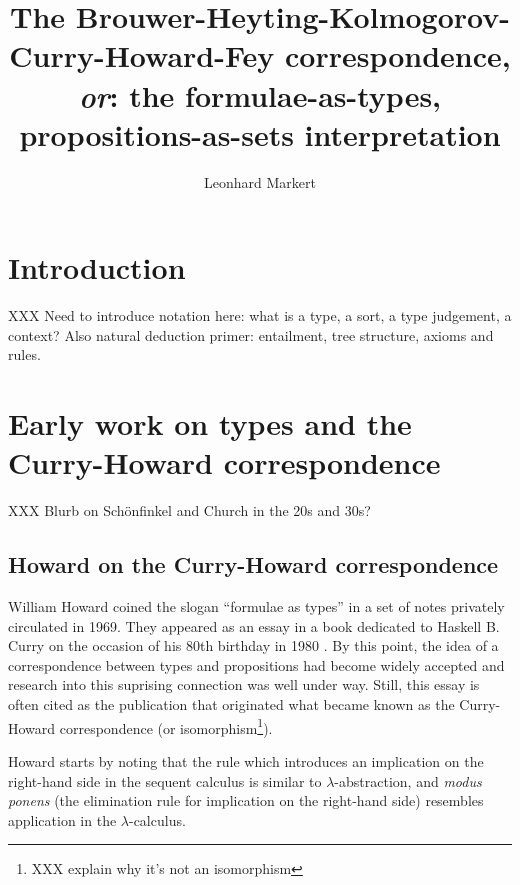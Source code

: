 \documentclass[12pt,toc=bibliography,numbers=noendperiod,
               footnotes=multiple,twoside]{scrartcl}
\title{The Brouwer-Heyting-Kolmogorov-Curry-Howard-Fey correspondence,\\\emph{or}: the formulae-as-types, propositions-as-sets interpretation}
\author{Leonhard Markert}
\begin{document}
\maketitle


\tableofcontents

\section{Introduction}


XXX Need to introduce notation here: what is a type, a sort, a type judgement, a context? Also natural deduction primer: entailment, tree structure, axioms and rules.

\section{Early work on types and the Curry-Howard correspondence}

XXX Blurb on Schönfinkel and Church in the 20s and 30s?

\subsection{Howard on the Curry-Howard correspondence}

William Howard coined the slogan \enquote{formulae as types} in a set of notes privately circulated in 1969. They appeared as an essay in a book dedicated to Haskell B. Curry on the occasion of his 80th birthday in 1980 \autocite{howard_formulae-as-types_1980}. By this point, the idea of a correspondence between types and propositions had become widely accepted and research into this suprising connection was well under way. Still, this essay is often cited as the publication that originated what became known as the Curry-Howard correspondence (or isomorphism\footnote{XXX explain why it's not an isomorphism}).

Howard starts by noting that the rule which introduces an implication on the right-hand side in the sequent calculus is similar to \(\lambda\)-abstraction, and \emph{modus ponens} (the elimination rule for implication on the right-hand side) resembles application in the \(\lambda\)-calculus.
\end{document}
